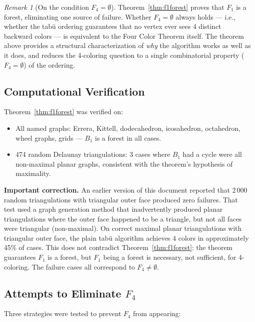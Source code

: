 \documentclass[12pt,letterpaper]{article}
\theoremstyle{plain}
\theoremstyle{definition}
\theoremstyle{remark}
\newtheorem{remark}[theorem]{Remark}
\begin{document}
\begin{remark}[On the condition $F_4 = \emptyset$]
Theorem~\ref{thm:f1forest} proves that $F_1$ is a forest, eliminating one
source of failure. Whether $F_4 = \emptyset$ always holds — i.e., whether the
tab\"{u} ordering guarantees that no vertex ever sees 4 distinct backward colors
— is equivalent to the Four Color Theorem itself. The theorem above provides a
structural characterization of \emph{why} the algorithm works as well as it
does, and reduces the 4-coloring question to a single combinatorial property
($F_4 = \emptyset$) of the ordering.
\end{remark}

\subsection{Computational Verification}

Theorem~\ref{thm:f1forest} was verified on:
\begin{itemize}[noitemsep]
    \item All named graphs: Errera, Kittell, dodecahedron, icosahedron,
        octahedron, wheel graphs, grids — $B_1$ is a forest in all cases.
    \item 474 random Delaunay triangulations: 3 cases where $B_1$ had a
        cycle were all non-maximal planar graphs, consistent with the
        theorem's hypothesis of maximality.
\end{itemize}

\textbf{Important correction.} An earlier version of this document reported that
2\,000 random triangulations with triangular outer face produced zero failures.
That test used a graph generation method that inadvertently produced planar
triangulations where the outer face happened to be a triangle, but not all faces
were triangular (non-maximal). On correct maximal planar triangulations with
triangular outer face, the plain tab\"{u} algorithm achieves 4 colors in
approximately 45\% of cases. This does not contradict
Theorem~\ref{thm:f1forest}: the theorem guarantees $F_1$ is a forest, but
$F_1$ being a forest is necessary, not sufficient, for 4-coloring. The failure
cases all correspond to $F_4 \neq \emptyset$.

\subsection{Attempts to Eliminate $F_4$}

Three strategies were tested to prevent $F_4$ from appearing:
\end{document}
